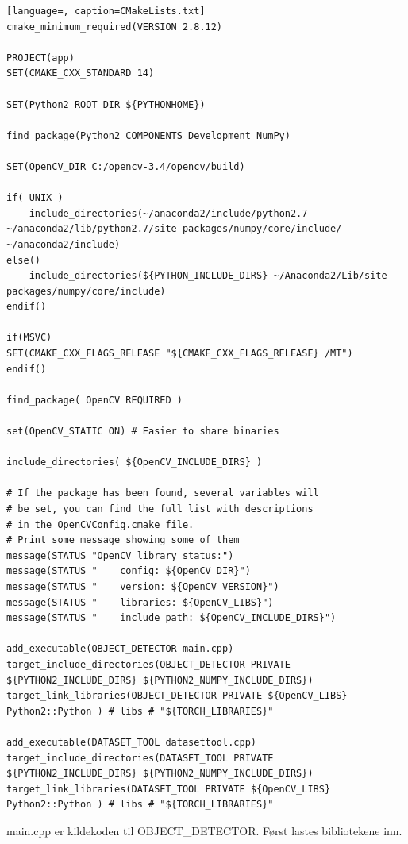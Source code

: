 \begin{lstlisting}[language=, caption=CMakeLists.txt]
cmake_minimum_required(VERSION 2.8.12)

PROJECT(app)
SET(CMAKE_CXX_STANDARD 14)

SET(Python2_ROOT_DIR ${PYTHONHOME})

find_package(Python2 COMPONENTS Development NumPy)

SET(OpenCV_DIR C:/opencv-3.4/opencv/build)

if( UNIX )
    include_directories(~/anaconda2/include/python2.7 ~/anaconda2/lib/python2.7/site-packages/numpy/core/include/ ~/anaconda2/include)
else()
    include_directories(${PYTHON_INCLUDE_DIRS} ~/Anaconda2/Lib/site-packages/numpy/core/include)
endif()

if(MSVC)
SET(CMAKE_CXX_FLAGS_RELEASE "${CMAKE_CXX_FLAGS_RELEASE} /MT")
endif()

find_package( OpenCV REQUIRED )

set(OpenCV_STATIC ON) # Easier to share binaries

include_directories( ${OpenCV_INCLUDE_DIRS} )

# If the package has been found, several variables will
# be set, you can find the full list with descriptions
# in the OpenCVConfig.cmake file.
# Print some message showing some of them
message(STATUS "OpenCV library status:")
message(STATUS "    config: ${OpenCV_DIR}")
message(STATUS "    version: ${OpenCV_VERSION}")
message(STATUS "    libraries: ${OpenCV_LIBS}")
message(STATUS "    include path: ${OpenCV_INCLUDE_DIRS}")

add_executable(OBJECT_DETECTOR main.cpp)
target_include_directories(OBJECT_DETECTOR PRIVATE ${PYTHON2_INCLUDE_DIRS} ${PYTHON2_NUMPY_INCLUDE_DIRS})
target_link_libraries(OBJECT_DETECTOR PRIVATE ${OpenCV_LIBS} Python2::Python ) # libs # "${TORCH_LIBRARIES}"

add_executable(DATASET_TOOL datasettool.cpp)
target_include_directories(DATASET_TOOL PRIVATE ${PYTHON2_INCLUDE_DIRS} ${PYTHON2_NUMPY_INCLUDE_DIRS})
target_link_libraries(DATASET_TOOL PRIVATE ${OpenCV_LIBS} Python2::Python ) # libs # "${TORCH_LIBRARIES}"
\end{lstlisting}

main.cpp er kildekoden til OBJECT\_DETECTOR. Først lastes bibliotekene inn.

